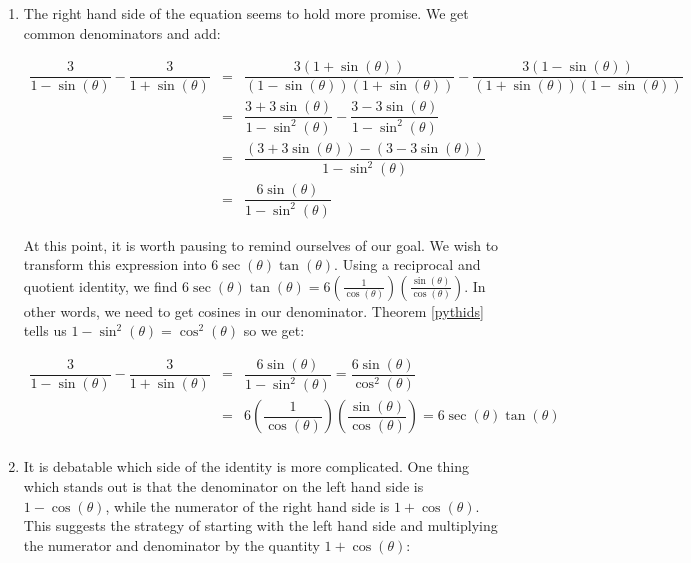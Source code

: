 {\begin{enumerate}
\item  The right hand side of the equation seems to hold more promise.  We get common denominators and add:

\[ \begin{array}{rcl}

\dfrac{3}{1-\sin(\theta)} - \dfrac{3}{1 + \sin(\theta)} & = & \dfrac{3(1 + \sin(\theta))}{(1-\sin(\theta))(1 + \sin(\theta))} - \dfrac{3(1-\sin(\theta))}{(1 + \sin(\theta))(1-\sin(\theta))} \\ [.25in]
                                                        & = & \dfrac{3 + 3\sin(\theta)}{1 - \sin^{2}(\theta)} - \dfrac{3 - 3\sin(\theta)}{1 - \sin^{2}(\theta)} \\ [.25in]
                                                        & = & \dfrac{(3 + 3\sin(\theta)) - (3 - 3\sin(\theta))}{1 - \sin^{2}(\theta)} \\ [.25in]                                                        																																	& = & \dfrac{6 \sin(\theta)}{1 - \sin^{2}(\theta)} \end{array} \]

At this point, it is worth pausing to remind ourselves of our goal.  We wish to transform this expression into $6\sec(\theta) \tan(\theta)$.  Using a reciprocal and quotient identity, we find $6\sec(\theta) \tan(\theta) = 6 \left(\frac{1}{\cos(\theta)}\right) \left(\frac{\sin(\theta)}{\cos(\theta)}\right)$.  In other words, we need to get cosines in our denominator. Theorem \ref{pythids} tells us $1 -  \sin^{2}(\theta) = \cos^{2}(\theta)$ so we get:

\[ \begin{array}{rcl}

\dfrac{3}{1-\sin(\theta)} - \dfrac{3}{1 + \sin(\theta)} & = & \dfrac{6 \sin(\theta)}{1 - \sin^{2}(\theta)}= \dfrac{6 \sin(\theta)}{\cos^{2}(\theta)} \\ [.25in]
& = &  6 \left(\dfrac{1}{\cos(\theta)}\right)\left( \dfrac{\sin(\theta)}{\cos(\theta)}\right) = 6 \sec(\theta) \tan(\theta) \\ \end{array} \]

\item  It is debatable which side of the identity is more complicated.  One thing which stands out is that the denominator on the left hand side is $1-\cos(\theta)$, while the numerator of the right hand side is $1+\cos(\theta)$.  This suggests the strategy of starting with the left hand side and multiplying the numerator and denominator by the quantity $1+\cos(\theta)$:


\end{enumerate}}
